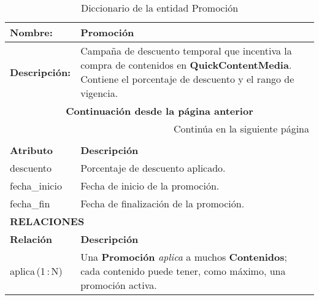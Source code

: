 \renewcommand{\arraystretch}{1.3}
\begin{longtable}{|p{3.5cm}|p{10cm}|}
\caption{Diccionario de la entidad Promoción}
\label{tab:diccionarioPromocion} \\ 
\hline
\textbf{Nombre:} & Promoción \\
\hline
\textbf{Descripción:} & 
Campaña de descuento temporal que incentiva la compra de contenidos
en \textbf{QuickContentMedia}.  Contiene el porcentaje de descuento y
el rango de vigencia. \\ \hline
\endfirsthead

\multicolumn{2}{c}{\textbf{Continuación desde la página anterior}} \\ 
\endhead

\hline \multicolumn{2}{r}{{Continúa en la siguiente página}} \\ 
\endfoot

\hline
\endlastfoot

\multicolumn{2}{|p{13.5cm}|}{\textbf{ATRIBUTOS}} \\ \hline
\textbf{Atributo} & \textbf{Descripción} \\ \hline
descuento     & Porcentaje de descuento aplicado. \\ \hline
fecha\_inicio & Fecha de inicio de la promoción. \\ \hline
fecha\_fin    & Fecha de finalización de la promoción. \\ \hline

\multicolumn{2}{|p{13.5cm}|}{\textbf{RELACIONES}} \\ \hline
\textbf{Relación} & \textbf{Descripción} \\ \hline
aplica\,(1\,:\,N) & Una \textbf{Promoción} \textit{aplica} a muchos
                    \textbf{Contenidos}; cada contenido puede tener,
                    como máximo, una promoción activa. \\ \hline
\end{longtable}